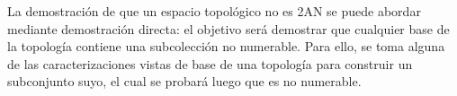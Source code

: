 La demostración de que un espacio topológico no es 2AN se puede abordar mediante demostración directa: el objetivo será demostrar que cualquier base de la topología contiene una subcolección no numerable. Para ello, se toma alguna de las caracterizaciones vistas de base de una topología para construir un subconjunto suyo, el cual se probará luego que es no numerable.



